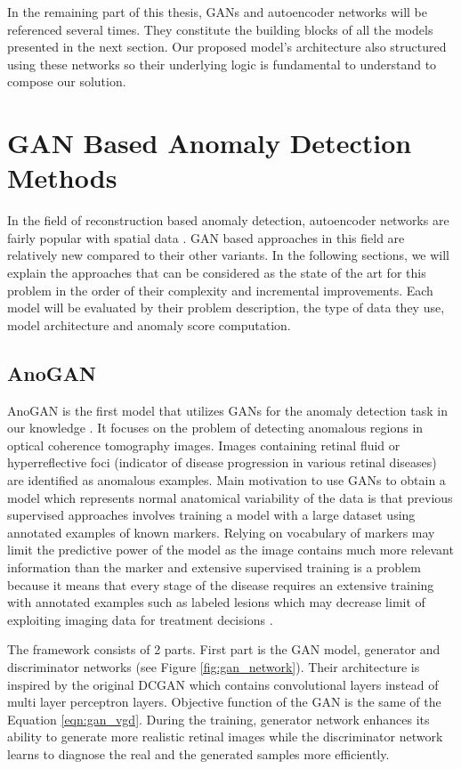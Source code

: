 In the remaining part of this thesis, GANs and autoencoder networks will be referenced 
several times. They constitute the building blocks of all the models presented in the next section. Our proposed 
model's architecture also structured using these networks so their underlying logic is fundamental to understand 
to compose our solution.

\section{GAN Based Anomaly Detection Methods}
\label{sec:gan_based_sota}
In the field of reconstruction based anomaly detection, autoencoder networks 
are fairly popular with spatial data \cite{baldi2012autoencoders,leveau2017adversarial,an2015variational}.
GAN based approaches in this field are relatively new compared to their other variants.
In the following sections, we will explain the approaches that can be considered as the state of
the art for this problem in the order of their complexity and incremental improvements. Each
model will be evaluated by their problem description, the type of data they use, model
architecture and anomaly score computation. 

\subsection{AnoGAN}
\label{sec:anogan}
 AnoGAN is the first model that utilizes GANs for the anomaly detection task in our knowledge
\cite{Schlegl2017UnsupervisedAD}. It focuses on the problem of detecting anomalous regions in optical
coherence tomography images. Images containing retinal fluid or hyperreflective foci (indicator of
disease progression in various retinal diseases) are identified as anomalous examples. Main
motivation to use GANs to obtain a model which represents normal anatomical variability of the data
is that previous supervised approaches involves training a model with a large dataset using
annotated examples of known markers. Relying on vocabulary of markers may limit the predictive power
of the model as the image contains much more relevant information than the marker and extensive
supervised training is a problem because it means that every stage of the disease requires an
extensive training with annotated examples such as labeled lesions which may decrease limit of
exploiting imaging data for treatment decisions \cite{Schlegl2017UnsupervisedAD}.


The framework consists of 2 parts. First part is the GAN model, generator and discriminator
networks (see Figure \ref{fig:gan_network}). Their architecture is inspired by the original DCGAN
\cite{Radford2016UnsupervisedRL} which contains convolutional layers instead of multi layer perceptron 
layers. Objective function of the GAN is the same of the Equation \ref{eqn:gan_vgd}. 
During the training, generator network enhances its ability to generate more realistic
retinal images while the discriminator network learns to diagnose the real and the generated samples more
efficiently. 

